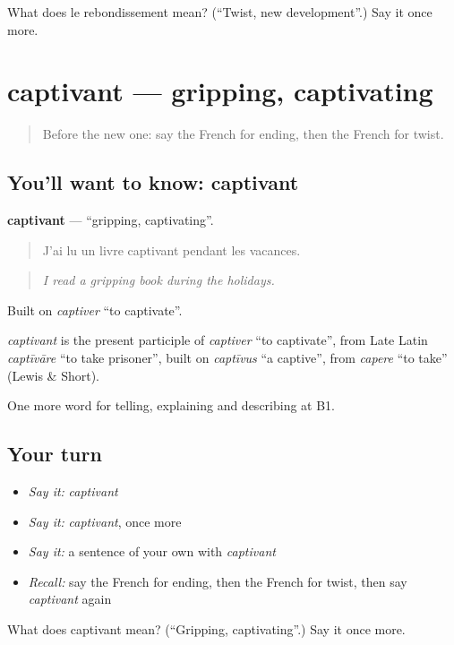 \begin{tcolorbox}[breakable,colback=teal!4,colframe=teal!35!black,title={Before you move on}]
What does le rebondissement mean? (\textquotedblleft{}Twist, new development\textquotedblright{}.) Say it once more.
\end{tcolorbox}
\section[captivant]{captivant — gripping, captivating}

\label{lesson:FR-C519-captivant}



\begin{quote}
Before the new one: say the French for ending, then the French for twist.
\end{quote}

\subsection*{You'll want to know: captivant}
\textbf{captivant} — \textquotedblleft{}gripping, captivating\textquotedblright{}.

\begin{quote}
J'ai lu un livre captivant pendant les vacances.
\end{quote}

\begin{quote}
\emph{I read a gripping book during the holidays.}
\end{quote}

Built on \emph{captiver} \textquotedblleft{}to captivate\textquotedblright{}.

\begin{cousinweb}
\emph{captivant} is the present participle of \emph{captiver} \textquotedblleft{}to captivate\textquotedblright{}, from Late Latin \emph{captīvāre} \textquotedblleft{}to take prisoner\textquotedblright{}, built on \emph{captīvus} \textquotedblleft{}a captive\textquotedblright{}, from \emph{capere} \textquotedblleft{}to take\textquotedblright{} (Lewis \& Short).
\end{cousinweb}

\begin{grammarlens}[title={What you've built}]
One more word for telling, explaining and describing at B1.
\end{grammarlens}

\subsection*{Your turn}
\begin{itemize}
\raggedright
  \item \emph{Say it:} \emph{captivant}
  \item \emph{Say it:} \emph{captivant}, once more
  \item \emph{Say it:} a sentence of your own with \emph{captivant}
  \item \emph{Recall:} say the French for ending, then the French for twist, then say \emph{captivant} again
\end{itemize}

\begin{tcolorbox}[breakable,colback=teal!4,colframe=teal!35!black,title={Before you move on}]
What does captivant mean? (\textquotedblleft{}Gripping, captivating\textquotedblright{}.) Say it once more.
\end{tcolorbox}
